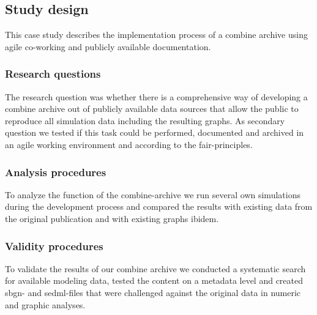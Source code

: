 \subsection*{Study design}
This case study describes the implementation process of a \ac{combine} archive using agile co-working and publicly available documentation.
\subsubsection*{Research questions}
The research question was whether there is a comprehensive way of developing a \ac{combine} archive out of publicly available data sources that allow the public to reproduce all simulation data including the resulting graphs. As secondary question we tested if this task could be performed, documented and archived in an agile working environment and according to the \acs{fair}-principles.
\subsubsection*{Analysis procedures}
To analyze the function of the \ac{combine}-archive we run several own simulations during the development process and compared the results with existing data from the original publication and with existing graphs ibidem.
\subsubsection*{Validity procedures}
To validate the results of our \ac{combine} archive we conducted a systematic search for available modeling data, tested the content on a metadata level and created \ac{sbgn}- and \ac{sedml}-files that were challenged against the original data in numeric and graphic analyses.


